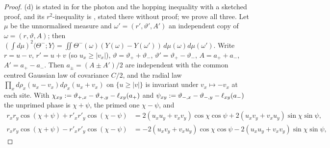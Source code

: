 \begin{proof}
(d) is stated in \cite[Thm.~6.2(3),(4)]{BFS1} for the photon and the hopping inequality with a sketched proof, and its $r^2$-inequality is \cite[(3.28)]{K2}, stated there without proof; we prove all three. Let $\mu$ be the unnormalised measure and $\omega'=(r',\vartheta',A')$ an independent copy of $\omega=(r,\vartheta,A)$; then $(\int d\mu)^2\langle\Theta^-;Y\rangle=\iint\Theta^-(\omega)(Y(\omega)-Y(\omega'))\,d\mu(\omega)d\mu(\omega')$. Write $r=u-v$, $r'=u+v$ (so $u_x\ge|v_x|$), $\vartheta=\vartheta_++\vartheta_-$, $\vartheta'=\vartheta_+-\vartheta_-$, $A=a_++a_-$, $A'=a_+-a_-$. Then $a_\pm=(A\pm A')/2$ are independent with the common centred Gaussian law of covariance $C/2$, and the radial law $\prod_xd\rho_x(u_x-v_x)d\rho_x(u_x+v_x)$ on $\{u\ge|v|\}$ is invariant under $v_x\mapsto-v_x$ at each site. With $\chi_{xy}:=\vartheta_{+,x}-\vartheta_{+,y}-\ell_{xy}(a_+)$ and $\psi_{xy}:=\vartheta_{-,x}-\vartheta_{-,y}-\ell_{xy}(a_-)$ the unprimed phase is $\chi+\psi$, the primed one $\chi-\psi$, and
\begin{align*}
r_xr_y\cos(\chi+\psi)+r'_xr'_y\cos(\chi-\psi)&=2(u_xu_y+v_xv_y)\cos\chi\cos\psi+2(u_xv_y+v_xu_y)\sin\chi\sin\psi,\\
r_xr_y\cos(\chi+\psi)-r'_xr'_y\cos(\chi-\psi)&=-2(u_xv_y+v_xu_y)\cos\chi\cos\psi-2(u_xu_y+v_xv_y)\sin\chi\sin\psi,
\end{align*}

\end{proof}
